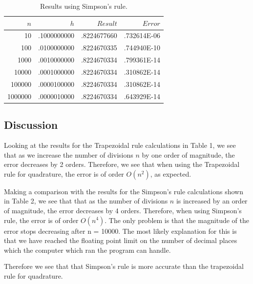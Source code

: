 \documentclass[a4paper]{IEEEtran}
\begin{document}
    \begin{table}[h] 
    \caption{Results using Simpson's rule.} 
    \label{tbl:simpsons} 
    \begin{center}
    \begin{tabular}{|r|r|r|r|} \hline
            $n$   &          $h$  &      $Result$ &        $Error$ \\
    \hline 
    \hline
           10   &.1000000000   &.8224677660   &.732614E-06 \\
          100   &.0100000000   &.8224670335   &.744940E-10 \\
         1000   &.0010000000   &.8224670334   &.799361E-14 \\
        10000   &.0001000000   &.8224670334   &.310862E-14 \\
       100000   &.0000100000   &.8224670334   &.310862E-14 \\
      1000000   &.0000010000   &.8224670334   &.643929E-14 \\ \hline
    \end{tabular}
    \end{center}
    \end{table} 
  
\subsection{Discussion}

    Looking at the results for the Trapezoidal rule calculations 
    in Table 1, we see that as we increase the
    number of divisions $n$ by one order of magnitude, the error
    decreases by 2 orders. Therefore, we see that when using the
    Trapezoidal rule for quadrature, the error is of order $O(n^2)$, as 
    expected.

    Making a comparison with the results for the Simpson's rule
    calculations shown in Table 2, we see that that as the number of
    divisions $n$ is increased by an order of magnitude, the error
    decreases by 4 orders. Therefore, when using Simpson's rule, the
    error is of order $O(n^4)$. 
    The only problem is that the magnitude of the error stops decreasing
    after n = 10000. The most likely explanation for this is that we
    have reached the floating point limit on the number of decimal
    places which the computer which ran the program can handle.

    Therefore we see that that Simpson's rule is more accurate than the
    trapezoidal rule for quadrature.

\end{document}
